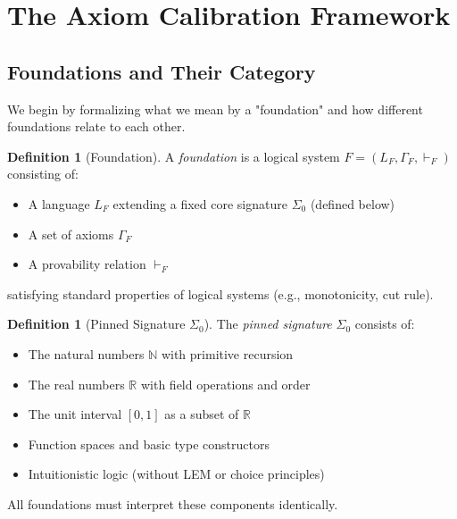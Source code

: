 \documentclass[11pt]{article}
\theoremstyle{plain}
\theoremstyle{definition}
\newtheorem{definition}[theorem]{Definition}
\newcommand{\N}{\mathbb{N}}
\newcommand{\R}{\mathbb{R}}
\newcommand{\SigmaZero}{\Sigma_{0}}
\begin{document}
\section{The Axiom Calibration Framework}

\subsection{Foundations and Their Category}

We begin by formalizing what we mean by a "foundation" and how different foundations relate to each other.

\begin{definition}[Foundation]\label{def:foundation}
A \emph{foundation} is a logical system $F = (L_F, \Gamma_F, \vdash_F)$ consisting of:
\begin{itemize}
\item A language $L_F$ extending a fixed core signature $\SigmaZero$ (defined below)
\item A set of axioms $\Gamma_F$
\item A provability relation $\vdash_F$
\end{itemize}
satisfying standard properties of logical systems (e.g., monotonicity, cut rule).
\end{definition}

\begin{definition}[Pinned Signature $\SigmaZero$]\label{def:sigma0}
The \emph{pinned signature} $\SigmaZero$ consists of:
\begin{itemize}
\item The natural numbers $\N$ with primitive recursion
\item The real numbers $\R$ with field operations and order
\item The unit interval $[0,1]$ as a subset of $\R$
\item Function spaces and basic type constructors
\item Intuitionistic logic (without LEM or choice principles)
\end{itemize}
All foundations must interpret these components identically.
\end{definition}
\end{document}
